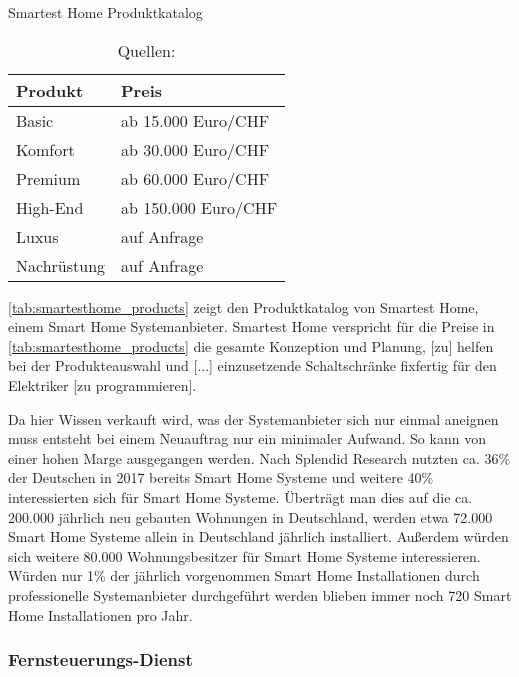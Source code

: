 \begin{table}[ht]
	\caption{Smartest Home Produktkatalog}
	\centering
	\begin{tabular}{| p{} | p{} |}
		\hline
		\textbf{Produkt} & \textbf{Preis} \\ \hline
		Basic & ab 15.000 Euro/CHF \\ \hline
		Komfort & ab 30.000 Euro/CHF \\ \hline
		Premium & ab 60.000 Euro/CHF \\ \hline
		High-End & ab 150.000 Euro/CHF \\ \hline
		Luxus & auf Anfrage \\ \hline
		Nachrüstung & auf Anfrage \\ \hline
	\end{tabular}
	\caption*{\footnotesize{Quellen: }}
	\label{tab:smartesthome_products}
\end{table}

\autoref{tab:smartesthome_products} zeigt den Produktkatalog von Smartest Home, einem Smart Home Systemanbieter.
Smartest Home verspricht für die Preise in \autoref{tab:smartesthome_products} \glqq die gesamte Konzeption und Planung, [zu] helfen bei der Produkteauswahl und [...] einzusetzende Schaltschränke fixfertig für den Elektriker [zu programmieren].\grqq{} 

Da hier Wissen verkauft wird, was der Systemanbieter sich nur einmal aneignen muss entsteht bei einem Neuauftrag nur ein minimaler Aufwand.
So kann von einer hohen Marge ausgegangen werden.
Nach Splendid Research nutzten ca. 36\% der Deutschen in 2017 bereits Smart Home Systeme und weitere 40\% interessierten sich für Smart Home Systeme.
Überträgt man dies auf die ca. 200.000 jährlich neu gebauten Wohnungen in Deutschland, werden etwa 72.000 Smart Home Systeme allein in Deutschland jährlich installiert.
Außerdem würden sich weitere 80.000 Wohnungsbesitzer für Smart Home Systeme interessieren.
Würden nur 1\% der jährlich vorgenommen Smart Home Installationen durch professionelle Systemanbieter durchgeführt werden blieben immer noch 720 Smart Home Installationen pro Jahr.

\subsubsection{Fernsteuerungs-Dienst}

